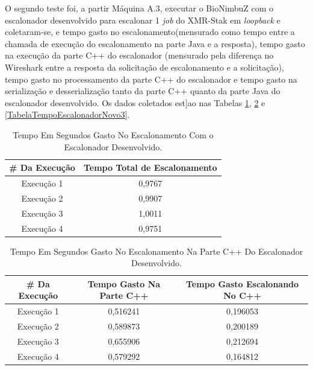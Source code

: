 O segundo teste foi, a partir Máquina A.3, executar o BioNimbuZ com o escalonador desenvolvido para escalonar 1 \textit{job} do XMR-Stak em \textit{loopback} e coletaram-se, e tempo gasto no escalonamento(mensurado como tempo entre a chamada de execução do escalonamento na parte Java e a resposta), tempo gasto na execução da parte C++ do escalonador (mensurado pela diferença no Wireshark entre a resposta da solicitação de escalonamento e a solicitação), tempo gasto no processamento da parte C++ do escalonador e tempo gasto na serialização e desserialização tanto da parte C++ quanto da parte Java do escalonador desenvolvido. Os dados coletados est]ao nas Tabelas \ref{TabelaTempoEscalonadorNovo}, \ref{TabelaTempoEscalonadorNovo2} e \ref{TabelaTempoEscalonadorNovo3}.

\begin {table}[H]
\begin{center}
	\begin{tabular}{ |c|c| } 
		\hline
		\#  Da Execução & Tempo Total de Escalonamento \\ 
		\hline
		Execução 1 & 0,9767 \\ 
		\hline
		Execução 2 & 0,9907 \\ 
		\hline
		Execução 3 & 1,0011 \\ 
		\hline
		Execução 4 & 0,9751 \\ 
		\hline
	\end{tabular}
	\caption {Tempo Em Segundos Gasto No Escalonamento Com o Escalonador Desenvolvido.} \label{TabelaTempoEscalonadorNovo} 
\end{center}
\end {table}

\begin {table}[H]
\begin{center}
	\begin{tabular}{ |c|c|c| } 
		\hline
		\#  Da Execução & Tempo Gasto Na Parte C++ & Tempo Gasto Escalonando No C++ \\ 
		\hline
		Execução 1 & 0,516241 & 0,196053 \\ 
		\hline
		Execução 2 & 0,589873 & 0,200189 \\ 
		\hline
		Execução 3 & 0,655906 & 0,212694 \\ 
		\hline
		Execução 4 & 0,579292 & 0,164812 \\ 
		\hline
	\end{tabular}
	\caption {Tempo Em Segundos Gasto No Escalonamento Na Parte C++ Do Escalonador Desenvolvido.} \label{TabelaTempoEscalonadorNovo2} 
\end{center}
\end {table}

